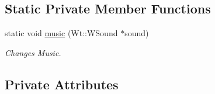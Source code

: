 \subsection*{Static Private Member Functions}
\begin{DoxyCompactItemize}
\item 
static void \hyperlink{classGroupsSchedulerControlWidget_a04f9fc065e234ccb7fdecbd951d8fbb7}{music} (Wt\+::\+W\+Sound $\ast$sound)
\begin{DoxyCompactList}\small\item\em Changes Music. \end{DoxyCompactList}\end{DoxyCompactItemize}
\subsection*{Private Attributes}
